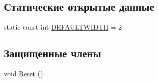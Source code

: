 \subsection*{Статические открытые данные}
\begin{DoxyCompactItemize}
\item 
static const int \hyperlink{class_profile_adc5551c9cef4089bd32d5358c2d27ec5}{D\-E\-F\-A\-U\-L\-T\-W\-I\-D\-T\-H} = 2
\end{DoxyCompactItemize}
\subsection*{Защищенные члены}
\begin{DoxyCompactItemize}
\item 
void \hyperlink{class_profile_a3cd865158aed8a6335c132acec3b734f}{Reset} ()
\end{DoxyCompactItemize}

